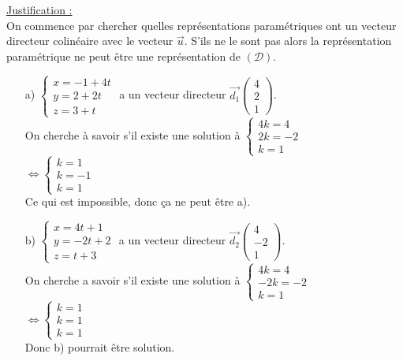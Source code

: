 \documentclass[a4paper, 12pt]{article}
\begin{document}
\noindent
\underline{Justification :}
\\
On commence par chercher quelles représentations paramétriques ont un vecteur directeur colinéaire avec le vecteur $\vec{u}$. S'ils ne le sont pas alors la représentation paramétrique 
ne peut être une représentation de $(\mathcal{D})$. 
\vspace{3mm}
\begin{itemize}
    \item[a)] $\begin{cases} x = -1 + 4t \\ y = 2 + 2t \\ z = 3 + t \end{cases}$ a un vecteur directeur $\vec{d_1}\begin{pmatrix} 4 \\ 2 \\ 1 \end{pmatrix}$. 
        \\On cherche à savoir s'il existe une solution à $\begin{cases} 4k = 4 \\ 2k = -2 \\ k = 1 \end{cases}$
        \\
        $\iff \begin{cases} k = 1 \\ k = -1 \\k = 1 \end{cases}$ 
        \\[2mm] 
        Ce qui est impossible, donc ça ne peut être a). \vspace{5mm}
    
    \item[b)]  $\begin{cases} x = 4t + 1 \\ y = -2t + 2 \\ z = t + 3 \end{cases}$ a un vecteur directeur $\vec{d_2}\begin{pmatrix} 4 \\ -2 \\ 1 \end{pmatrix}$. 
        \\On cherche a savoir s'il existe une solution à $\begin{cases} 4k = 4 \\ -2k = -2 \\ k = 1 \end{cases}$ 
        \\ 
        $\iff \begin{cases} k = 1 \\ k = 1 \\k = 1 \end{cases}$ 
        \\[2mm]
        Donc b) pourrait être solution. \vspace{5mm}


\end{itemize}
\end{document}
